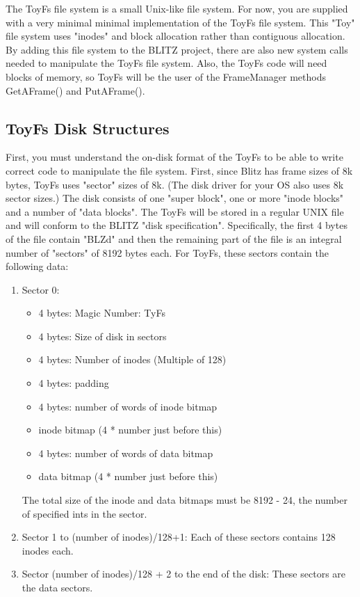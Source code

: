 \documentclass[12pt]{article}
\begin{document}
The ToyFs file system is a small Unix-like file
system.  For now, you are supplied with a very minimal minimal
implementation of the ToyFs file system.  This "Toy" file system uses
"inodes" and block allocation rather than contiguous allocation. By
adding this file system to the BLITZ project, there are also new
system calls needed to manipulate the ToyFs file system.  Also,
the ToyFs code will need blocks of memory, so ToyFs will be the user
of the FrameManager methods GetAFrame() and PutAFrame().

\subsection{ToyFs Disk Structures}

First, you must understand the on-disk format of the ToyFs to be able
to write correct code to manipulate the file system.  First, since
Blitz has frame sizes of 8k bytes, ToyFs uses "sector" sizes of 8k.
(The disk driver for your OS also uses 8k sector sizes.)  The disk
consists of one "super block", one or more "inode blocks" and a number
of "data blocks".  The ToyFs will be stored in a regular UNIX file and
will conform to the BLITZ "disk specification".  Specifically, the
first 4 bytes of the file contain "BLZd" and then the remaining part
of the file is an integral number of "sectors" of 8192 bytes each.
For ToyFs, these sectors contain the following data:

\begin{enumerate}
\item Sector 0:
  \begin{itemize}
   \item 4 bytes:  Magic Number: TyFs
   \item 4 bytes:  Size of disk in sectors
   \item 4 bytes:  Number of inodes (Multiple of 128)
   \item 4 bytes:  padding
   \item 4 bytes:  number of words of inode bitmap
   \item inode bitmap (4 * number just before this)
   \item 4 bytes:  number of words of data bitmap
   \item data bitmap (4 * number just before this)
  \end{itemize}
   The total size of the inode and data bitmaps must be
   8192 - 24, the number of specified ints in the sector.
\item Sector 1 to (number of inodes)/128+1: 
  Each of these sectors contains 128 inodes each.
\item Sector (number of inodes)/128 + 2 to the end of the disk:
  These sectors are the data sectors.
\end{enumerate}
\end{document}
